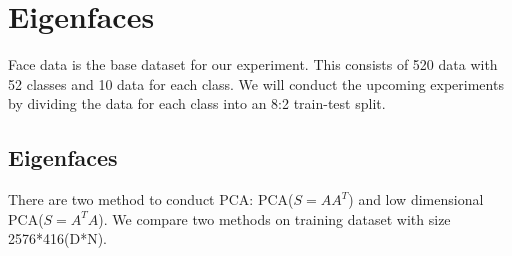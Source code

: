 \section{Eigenfaces}
\label{sec:intro}

Face data is the base dataset for our experiment. This consists of 520 data with 52 classes and 10 data for each class. We will conduct the upcoming experiments by dividing the data for each class into an 8:2 train-test split.

\subsection{Eigenfaces}

There are two method to conduct PCA: PCA($S=AA^T$) and low dimensional PCA($S=A^TA$). We compare two methods on training dataset with size 2576*416(D*N).

